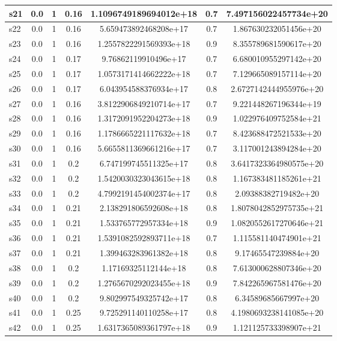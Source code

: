 \documentclass{article}
\begin{document}
\begin{tabular}{|l|c|c|c|c|c|c|}
\hline
s21 &0.0 & 1 & 0.16 & 1.1096749189694012e+18 & 0.7 & 7.497156022457734e+20\\
\hline
s22 &0.0 & 1 & 0.16 & 5.659473892468208e+17 & 0.7 & 1.867630232051456e+20\\
\hline
s23 &0.0 & 1 & 0.16 & 1.2557822291569393e+18 & 0.9 & 8.355789681590617e+20\\
\hline
s24 &0.0 & 1 & 0.17 & 9.76862119910496e+17 & 0.7 & 6.680010955297142e+20\\
\hline
s25 &0.0 & 1 & 0.17 & 1.0573171414662222e+18 & 0.7 & 7.129665089157114e+20\\
\hline
s26 &0.0 & 1 & 0.17 & 6.043954588376934e+17 & 0.8 & 2.6727142444955976e+20\\
\hline
s27 &0.0 & 1 & 0.16 & 3.8122906849210714e+17 & 0.7 & 9.221448267196344e+19\\
\hline
s28 &0.0 & 1 & 0.16 & 1.3172091952204273e+18 & 0.9 & 1.022976409752584e+21\\
\hline
s29 &0.0 & 1 & 0.16 & 1.1786665221117632e+18 & 0.7 & 8.423688472521533e+20\\
\hline
s30 &0.0 & 1 & 0.16 & 5.6655811369661216e+17 & 0.7 & 3.117001243894284e+20\\
\hline
s31 &0.0 & 1 & 0.2 & 6.747199745511325e+17 & 0.8 & 3.6417323364980575e+20\\
\hline
s32 &0.0 & 1 & 0.2 & 1.5420030323043615e+18 & 0.8 & 1.167383481185261e+21\\
\hline
s33 &0.0 & 1 & 0.2 & 4.7992191454002374e+17 & 0.8 & 2.09388382719482e+20\\
\hline
s34 &0.0 & 1 & 0.21 & 2.138291806592608e+18 & 0.8 & 1.8078042852975735e+21\\
\hline
s35 &0.0 & 1 & 0.21 & 1.533765772957334e+18 & 0.9 & 1.0820552617270646e+21\\
\hline
s36 &0.0 & 1 & 0.21 & 1.5391082592893711e+18 & 0.7 & 1.115581140474901e+21\\
\hline
s37 &0.0 & 1 & 0.21 & 1.399463283961382e+18 & 0.8 & 9.17465547239884e+20\\
\hline
s38 &0.0 & 1 & 0.2 & 1.17169325112144e+18 & 0.8 & 7.613000628807346e+20\\
\hline
s39 &0.0 & 1 & 0.2 & 1.2765670292023455e+18 & 0.9 & 7.842265967581476e+20\\
\hline
s40 &0.0 & 1 & 0.2 & 9.802997549325742e+17 & 0.8 & 6.34589685667997e+20\\
\hline
s41 &0.0 & 1 & 0.25 & 9.725291140110258e+17 & 0.8 & 4.1980693238141085e+20\\
\hline
s42 &0.0 & 1 & 0.25 & 1.6317365089361797e+18 & 0.9 & 1.121125733398907e+21\\

\end{tabular}
\end{document}
